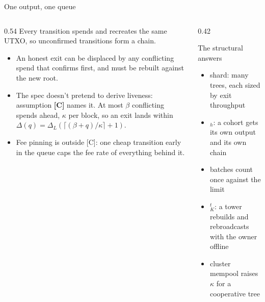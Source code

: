 \documentclass[aspectratio=169,10pt]{beamer}
\begin{document}
\begin{frame}{One output, one queue}
  \begin{columns}[T]
    \begin{column}{0.54\textwidth}
      Every transition spends and recreates the same UTXO, so unconfirmed transitions form a chain.
      \begin{itemize}
        \item An honest exit can be displaced by any conflicting spend that confirms first, and must be rebuilt against the new root.
        \item The spec doesn't pretend to derive liveness: assumption \textbf{[C]} names it. At most $\beta$ conflicting spends ahead, $\kappa$ per block, so an exit lands within
          $\Delta(q) = \Delta_L(\lceil(\beta+q)/\kappa\rceil + 1)$.
        \item Fee pinning is outside [C]: one cheap transition early in the queue caps the fee rate of everything behind it.
      \end{itemize}
    \end{column}
    \begin{column}{0.42\textwidth}
      \begin{block}{The structural answers}
        \begin{itemize}
          \item shard: many trees, each sized by exit throughput
          \item {}$_h$: a cohort gets its own output and its own chain
          \item batches count once against the limit
          \item {}$_K^t$: a tower rebuilds and rebroadcasts with the owner offline
          \item cluster mempool raises $\kappa$ for a cooperative tree
        \end{itemize}
      \end{block}
    \end{column}
  \end{columns}
\end{frame}
\end{document}
